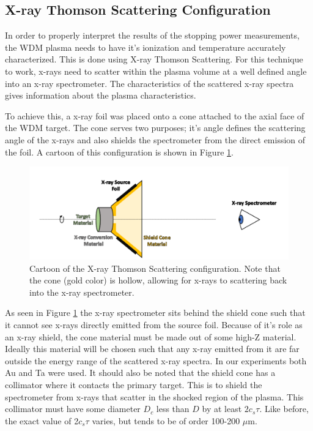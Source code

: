 \subsection{X-ray Thomson Scattering Configuration}
\label{sec:XRTS}

In order to properly interpret the results of the stopping power measurements, the WDM plasma needs to have it's ionization and temperature accurately characterized. This is done using X-ray Thomson Scattering. For this technique to work, x-rays need to scatter within the plasma volume at a well defined angle into an x-ray spectrometer. The characteristics of the scattered x-ray spectra gives information about the plasma characteristics.

To achieve this, a x-ray foil was placed onto a cone attached to the axial face of the WDM target. The cone serves two purposes; it's angle defines the scattering angle of the x-rays and also shields the spectrometer from the direct emission of the foil. A cartoon of this configuration is shown in Figure \ref{fig:wdmConeCartoon}.

\begin{figure}[h!]
    \centering
    \includegraphics[scale=0.7]{Figures/wdmConeCartoon.pdf}
    \caption[Carton of X-ray Thomson Scattering Configuration]{Cartoon of the X-ray Thomson Scattering configuration. Note that the cone (gold color) is hollow, allowing for x-rays to scattering back into the x-ray spectrometer.}
    \label{fig:wdmConeCartoon}
\end{figure}

As seen in Figure \ref{fig:wdmConeCartoon} the x-ray spectrometer sits behind the shield cone such that it cannot see x-rays directly emitted from the source foil. Because of it's role as an x-ray shield, the cone material must be made out of some high-Z material. Ideally this material will be chosen such that any x-ray emitted from it are far outside the energy range of the scattered x-ray spectra. In our experiments both Au and Ta were used. It should also be noted that the shield cone has a collimator where it contacts the primary target. This is to shield the spectrometer from x-rays that scatter in the shocked region of the plasma. This collimator must have some diameter $D_c$ less than $D$ by at least $2c_s\tau$. Like before, the exact value of 2$c_s\tau$ varies, but tends to be of order 100-200 $\mu$m. 

